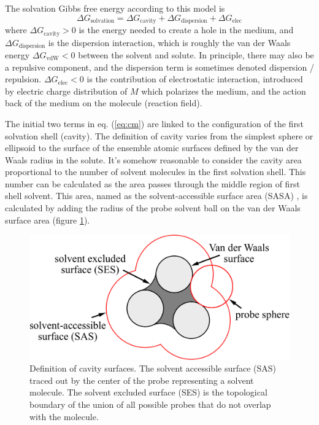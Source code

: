 The solvation Gibbs free energy according to this model is
\begin{equation}
\Delta G_{\mathrm{solvation}}=\Delta G_{\mathrm{cavity}}+\Delta G_{\mathrm{dispersion}}+\Delta G_{\mathrm{elec}}\label{eq:cm}
\end{equation}
where $\Delta G_{\mathrm{cavity}}>0$ is the energy needed to create
a hole in the medium, and $\Delta G_{\mathrm{dispersion}}$ is the
dispersion interaction, which is roughly the van der Waals energy
$\Delta G_{\mathrm{vdW}}<0$ between the solvent and solute. In principle,
there may also be a repulsive component, and the dispersion term is
sometimes denoted dispersion / repulsion. $\Delta G_{\mathrm{elec}}<0$
is the contribution of electrostatic interaction, introduced by electric
charge distribution of $M$ which polarizes the medium, and the action
back of the medium on the molecule (reaction field). 

The initial two terms in eq. (\ref{eq:cm}) are linked to the configuration
of the first solvation shell (cavity). The definition of cavity varies
from the simplest sphere or ellipsoid to the surface of the ensemble
atomic surfaces defined by the van der Waals radius in the solute.
It's somehow reasonable to consider the cavity area proportional to
the number of solvent molecules in the first solvation shell. This
number can be calculated as the area passes through the middle region
of first shell solvent. This area, named as the solvent-accessible
surface area (SASA) \citep{SAS_1,SAS_2}, is calculated by adding
the radius of the probe solvent ball on the van der Waals surface
area (figure \ref{fig:sasa}).

\begin{figure}[h]
\begin{centering}
\includegraphics[width=0.55\columnwidth]{_figure/SASA}
\par\end{centering}

\caption[Definition of cavity surfaces]{Definition of cavity surfaces\label{fig:sasa}. The solvent accessible
surface (SAS) traced out by the center of the probe representing a
solvent molecule. The solvent excluded surface (SES) is the topological
boundary of the union of all possible probes that do not overlap with
the molecule.}
\end{figure}


